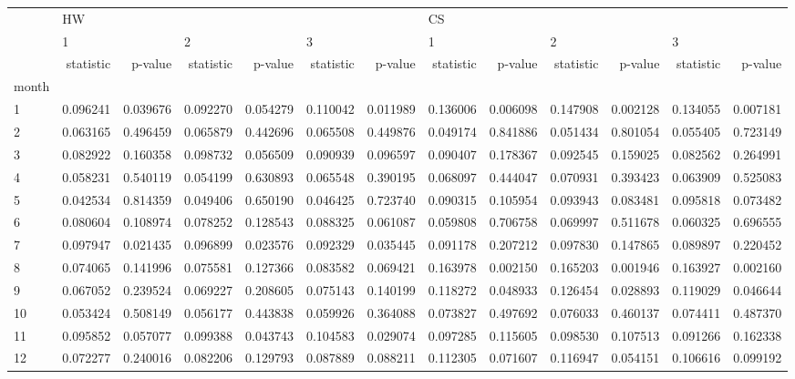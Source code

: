 \begin{tabular}{lrrrrrrrrrrrr}
\toprule
{} & \multicolumn{6}{l}{HW} & \multicolumn{6}{l}{CS} \\
{} & \multicolumn{2}{l}{1} & \multicolumn{2}{l}{2} & \multicolumn{2}{l}{3} & \multicolumn{2}{l}{1} & \multicolumn{2}{l}{2} & \multicolumn{2}{l}{3} \\
{} & statistic &   p-value & statistic &   p-value & statistic &   p-value & statistic &   p-value & statistic &   p-value & statistic &   p-value \\
month &           &           &           &           &           &           &           &           &           &           &           &           \\
\midrule
1     &  0.096241 &  0.039676 &  0.092270 &  0.054279 &  0.110042 &  0.011989 &  0.136006 &  0.006098 &  0.147908 &  0.002128 &  0.134055 &  0.007181 \\
2     &  0.063165 &  0.496459 &  0.065879 &  0.442696 &  0.065508 &  0.449876 &  0.049174 &  0.841886 &  0.051434 &  0.801054 &  0.055405 &  0.723149 \\
3     &  0.082922 &  0.160358 &  0.098732 &  0.056509 &  0.090939 &  0.096597 &  0.090407 &  0.178367 &  0.092545 &  0.159025 &  0.082562 &  0.264991 \\
4     &  0.058231 &  0.540119 &  0.054199 &  0.630893 &  0.065548 &  0.390195 &  0.068097 &  0.444047 &  0.070931 &  0.393423 &  0.063909 &  0.525083 \\
5     &  0.042534 &  0.814359 &  0.049406 &  0.650190 &  0.046425 &  0.723740 &  0.090315 &  0.105954 &  0.093943 &  0.083481 &  0.095818 &  0.073482 \\
6     &  0.080604 &  0.108974 &  0.078252 &  0.128543 &  0.088325 &  0.061087 &  0.059808 &  0.706758 &  0.069997 &  0.511678 &  0.060325 &  0.696555 \\
7     &  0.097947 &  0.021435 &  0.096899 &  0.023576 &  0.092329 &  0.035445 &  0.091178 &  0.207212 &  0.097830 &  0.147865 &  0.089897 &  0.220452 \\
8     &  0.074065 &  0.141996 &  0.075581 &  0.127366 &  0.083582 &  0.069421 &  0.163978 &  0.002150 &  0.165203 &  0.001946 &  0.163927 &  0.002160 \\
9     &  0.067052 &  0.239524 &  0.069227 &  0.208605 &  0.075143 &  0.140199 &  0.118272 &  0.048933 &  0.126454 &  0.028893 &  0.119029 &  0.046644 \\
10    &  0.053424 &  0.508149 &  0.056177 &  0.443838 &  0.059926 &  0.364088 &  0.073827 &  0.497692 &  0.076033 &  0.460137 &  0.074411 &  0.487370 \\
11    &  0.095852 &  0.057077 &  0.099388 &  0.043743 &  0.104583 &  0.029074 &  0.097285 &  0.115605 &  0.098530 &  0.107513 &  0.091266 &  0.162338 \\
12    &  0.072277 &  0.240016 &  0.082206 &  0.129793 &  0.087889 &  0.088211 &  0.112305 &  0.071607 &  0.116947 &  0.054151 &  0.106616 &  0.099192 \\
\bottomrule
\end{tabular}
